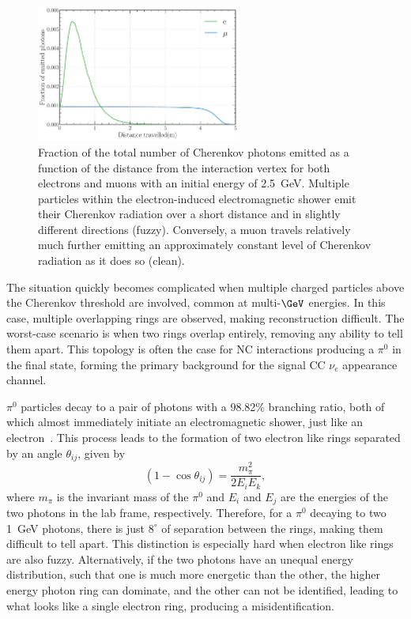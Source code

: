 \begin{figure} %
    \includegraphics[width=0.6\textwidth]{diagrams/4-chips/emission_distance.pdf}
    \caption[Fraction of Cherenkov photons emitted as a function of distance]
    {Fraction of the total number of Cherenkov photons emitted as a function of the distance from
        the interaction vertex for both electrons and muons with an initial energy of
        \SI{2.5}{\GeV}. Multiple particles within the electron-induced electromagnetic shower emit
        their Cherenkov radiation over a short distance and in slightly different directions
        (fuzzy). Conversely, a muon travels relatively much further emitting an approximately
        constant level of Cherenkov radiation as it does so (clean).}
    \label{fig:emission distance}
\end{figure}

The situation quickly becomes complicated when multiple charged particles above the Cherenkov
threshold are involved, common at multi-$\GeV$ energies. In this case, multiple overlapping rings
are observed, making reconstruction difficult. The worst-case scenario is when two rings overlap
entirely, removing any ability to tell them apart. This topology is often the case for NC
interactions producing a $\pi^{0}$ in the final state, forming the primary background for the
signal CC $\nu_{e}$ appearance channel.

$\pi^{0}$ particles decay to a pair of photons with a 98.82\% branching ratio, both of which
almost immediately initiate an electromagnetic shower, just like an electron~\cite{particle2020}.
This process leads to the formation of two electron like rings separated by an angle
$\theta_{ij}$, given by
\begin{equation}
    (1-\cos\theta_{ij})=\frac{m_{\pi}^2}{2E_{i}E_{k}},
\end{equation}
where $m_{\pi}$ is the invariant mass of the $\pi^{0}$ and $E_{i}$ and $E_{j}$ are the energies of
the two photons in the lab frame, respectively. Therefore, for a $\pi^{0}$ decaying to two
\SI{1}{\GeV} photons, there is just $8^{\circ}$ of separation between the rings, making them
difficult to tell apart. This distinction is especially hard when electron like rings are also
fuzzy. Alternatively, if the two photons have an unequal energy distribution, such that one is
much more energetic than the other, the higher energy photon ring can dominate, and the other can
not be identified, leading to what looks like a single electron ring, producing a
misidentification.

